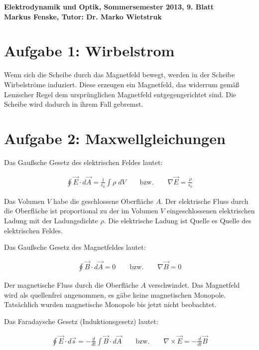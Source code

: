 \documentclass[a4paper,german,12pt,smallheadings]{scrartcl}
\begin{document}
\begin{center}
\bfseries %
\sffamily %
\vspace{-40pt}
Elektrodynamik und Optik, Sommersemester 2013, 9. Blatt \\
Markus Fenske, Tutor: Dr. Marko Wietstruk
\vspace{-10pt}
\end{center}
\section*{Aufgabe 1: Wirbelstrom}
Wenn sich die Scheibe durch das Magnetfeld bewegt, werden in der Scheibe
Wirbelströme induziert. Diese erzeugen ein Magnetfeld, das widerrum gemäß
Lenzscher Regel dem ursprünglichen Magnetfeld entgegengerichtet sind. Die
Scheibe wird dadurch in ihrem Fall gebremst.

\section*{Aufgabe 2: Maxwellgleichungen}

Das Gaußsche Gesetz des elektrischen Feldes lautet:

\begin{align*}
  \oint \vec{E} \cdot d\vec{A} = \frac{1}{\epsilon_0} \int \rho\;dV \qquad\text{bzw.}\qquad \nabla \vec{E} = \frac{\rho}{\epsilon_0}
\end{align*}

Das Volumen $V$ habe die geschlossene Oberfläche $A$. Der elektrische Fluss
durch die Oberfläche ist proportional zu der im Volumen $V$ eingeschlossenen
elektrischen Ladung mit der Ladungsdichte $\rho$. Die elektrische Ladung ist
Quelle es Quelle des elektrischen Feldes.

Das Gaußsche Gesetz des Magnetfeldes lautet:

\begin{align*}
  \oint \vec{B} \cdot d\vec{A} = 0 \qquad\text{bzw.}\qquad \nabla \vec{B} = 0
\end{align*}

Der magnetische Fluss durch die Oberfläche $A$ verschwindet. Das Magnetfeld
wird als quellenfrei angenommen, es gäbe keine magnetischen Monopole.
Tatsächlich wurden magnetische Monopole bis jetzt nicht beobachtet.

Das Faradaysche Gesetz (Induktionsgesetz) lautet:

\begin{align*}
  \oint \vec{E} \cdot d\vec{s} = -\frac{d}{dt} \int \vec{B} \cdot d\vec{A} \qquad\text{bzw.}\qquad \nabla \times \vec{E} = -\frac{d}{dt} \vec{B}
\end{align*}
\end{document}
